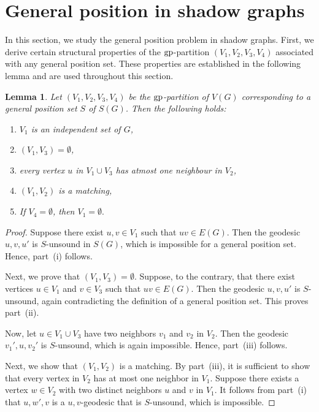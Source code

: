 \documentclass[a4paper,12pt]{article}
\newtheorem{lemma}[theorem]{Lemma}
\newcommand{\gp}{{\rm gp}}
\begin{document}
{ \section{General position in shadow graphs}
In this section, we study the general position problem in shadow graphs. First, we derive certain structural properties of the $\gp$-partition $(V_1, V_2, V_3, V_4)$ associated with any general position set. These properties are established in the following lemma and are used throughout this section.

\begin{lemma}\label{V_i property}
    Let $(V_1,V_2,V_3,V_4)$ be the $\gp$-partition of $V(G)$ corresponding to a general position set $S$ of $S(G)$. Then the following holds:

    \begin{enumerate}[label=\roman*.]
        \item   $V_1$ is an independent set of $G$, 
        \item $(V_1,V_3)= \emptyset$, 
        \item every vertex $u$ in $V_1 \cup V_3$ has atmost one neighbour in $V_2$,
        \item $(V_1,V_2)$ is a matching,
        \item If $V_4= \emptyset$, then $V_1=\emptyset.$
    \end{enumerate}
    \end{lemma}
    \begin{proof}
            Suppose there exist $u, v \in V_1$ such that $uv \in E(G)$. Then the geodesic $u, v, u'$ is $S$-unsound in $S(G)$, which is impossible for a general position set. Hence, part~(i) follows.


Next, we prove that $(V_1, V_3) = \emptyset$. Suppose, to the contrary, that there exist vertices $u \in V_1$ and $v \in V_3$ such that $uv \in E(G)$. Then the geodesic $u, v, u'$ is $S$-unsound, again contradicting the definition of a general position set. This proves part~(ii).

Now, let $u \in V_1 \cup V_3$ have two neighbors $v_1$ and $v_2$ in $V_2$. Then the geodesic $v_1', u, v_2'$ is $S$-unsound, which is again impossible. Hence, part~(iii) follows.


            Next, we show that $(V_1, V_2)$ is a matching. By part~(iii), it is sufficient to show that every vertex in $V_2$ has at most one neighbor in $V_1$. Suppose there exists a vertex $w \in V_2$ with two distinct neighbors $u$ and $v$ in $V_1$. It follows from part~(i) that $u, w', v$ is a $u,v$-geodesic that is $S$-unsound, which is impossible.


\end{proof}}
\end{document}
